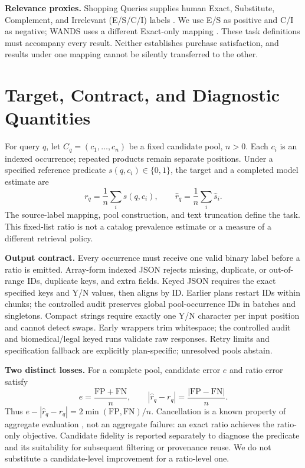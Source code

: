 \documentclass[conference]{IEEEtran}
\begin{document}
\textbf{Relevance proxies.} Shopping Queries supplies human Exact, Substitute, Complement, and Irrelevant (E/S/C/I) labels \cite{esci}. We use E/S as positive and C/I as negative; WANDS uses a different Exact-only mapping \cite{wands}. These task definitions must accompany every result. Neither establishes purchase satisfaction, and results under one mapping cannot be silently transferred to the other.

\section{Target, Contract, and Diagnostic Quantities}
For query $q$, let $C_q=(c_1,\ldots,c_n)$ be a fixed candidate pool, $n>0$. Each $c_i$ is an indexed occurrence; repeated products remain separate positions. Under a specified reference predicate $s(q,c_i)\in\{0,1\}$, the target and a completed model estimate are
\begin{equation}
r_q=\frac{1}{n}\sum_i s(q,c_i),\qquad
\hat r_q=\frac{1}{n}\sum_i\hat s_i.
\end{equation}
The source-label mapping, pool construction, and text truncation define the task. This fixed-list ratio is not a catalog prevalence estimate or a measure of a different retrieval policy.

\textbf{Output contract.} Every occurrence must receive one valid binary label before a ratio is emitted. Array-form indexed JSON rejects missing, duplicate, or out-of-range IDs, duplicate keys, and extra fields. Keyed JSON requires the exact specified keys and Y/N values, then aligns by ID. Earlier plans restart IDs within chunks; the controlled audit preserves global pool-occurrence IDs in batches and singletons. Compact strings require exactly one Y/N character per input position and cannot detect swaps. Early wrappers trim whitespace; the controlled audit and biomedical/legal keyed runs validate raw responses. Retry limits and specification fallback are explicitly plan-specific; unresolved pools abstain.

\textbf{Two distinct losses.} For a complete pool, candidate error $e$ and ratio error satisfy
\begin{equation}
e=\frac{\mathrm{FP}+\mathrm{FN}}{n},\qquad
|\hat r_q-r_q|=\frac{|\mathrm{FP}-\mathrm{FN}|}{n}.
\label{eq:cancellation}
\end{equation}
Thus $e-|\hat r_q-r_q|=2\min(\mathrm{FP},\mathrm{FN})/n$. Cancellation is a known property of aggregate evaluation \cite{runvariance}, not an aggregate failure: an exact ratio achieves the ratio-only objective. Candidate fidelity is reported separately to diagnose the predicate and its suitability for subsequent filtering or provenance reuse. We do not substitute a candidate-level improvement for a ratio-level one.
\end{document}
